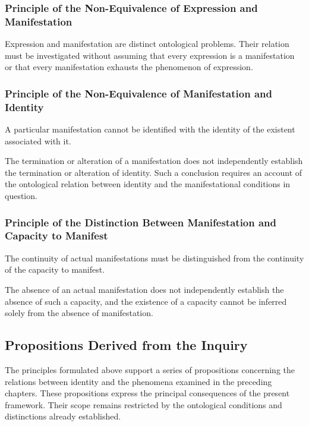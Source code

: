 \subsubsection{Principle of the Non-Equivalence of Expression and Manifestation}

Expression and manifestation are distinct ontological
problems. Their relation must be investigated without
assuming that every expression is a manifestation or
that every manifestation exhausts the phenomenon of
expression.

\subsubsection{Principle of the Non-Equivalence of Manifestation and Identity}

A particular manifestation cannot be identified with
the identity of the existent associated with it.

The termination or alteration of a manifestation does
not independently establish the termination or alteration
of identity. Such a conclusion requires an account of
the ontological relation between identity and the
manifestational conditions in question.

\subsubsection{Principle of the Distinction Between Manifestation and Capacity to Manifest}

The continuity of actual manifestations must be
distinguished from the continuity of the capacity to
manifest.

The absence of an actual manifestation does not
independently establish the absence of such a capacity,
and the existence of a capacity cannot be inferred
solely from the absence of manifestation.


\subsection{Propositions Derived from the Inquiry}

The principles formulated above support a series of
propositions concerning the relations between identity
and the phenomena examined in the preceding chapters.
These propositions express the principal consequences
of the present framework. Their scope remains restricted
by the ontological conditions and distinctions already
established.

